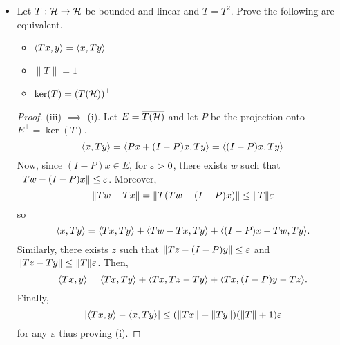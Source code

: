 \begin{itemize}
\item Let $T : \mathcal{H} \to \mathcal{H}$ be bounded and linear and $T=T^2$. Prove the following are equivalent.
	\begin{itemize}
		\item[(i)] $\langle Tx,y\rangle = \langle x,Ty\rangle$
		\item[(ii)] $\|T\|=1$
		\item[(iii)] $\ker(T)=(T(\mathcal{H}))^\perp$
	\end{itemize}
\begin{proof}
(iii) $\implies$ (i). Let $E = \overline{T(\mathcal{H})}$ and let $P$ be the projection onto $E^\perp = \ker(T)$.
	\[ \langle x,Ty \rangle = \langle Px + (I-P)x,Ty \rangle = \langle (I-P)x,Ty \rangle \]
Now, since $(I-P)x \in E$, for $\varepsilon>0$, there exists $w$ such that $\|Tw-(I-P)x\| \le \varepsilon$. Moreover,
	\[ \|Tw - Tx\| = \|T(Tw-(I-P)x)\| \le \|T\| \varepsilon \]
so
	\[ \langle x,Ty \rangle = \langle Tx,Ty \rangle + \langle Tw-Tx,Ty \rangle + \langle (I-P)x-Tw,Ty \rangle. \]
Similarly, there exists $z$ such that $\|Tz-(I-P)y\| \le \varepsilon$ and $\|Tz-Ty\| \le \|T\|\varepsilon$. Then,
	\[ \langle Tx,y \rangle = \langle Tx,Ty \rangle + \langle Tx,Tz-Ty \rangle + \langle Tx,(I-P)y-Tz \rangle. \]
Finally,
	\[ |\langle Tx,y \rangle - \langle x,Ty\rangle| \le (\|Tx\| + \|Ty\|)(\|T\|+1)\varepsilon \]
for any $\varepsilon$ thus proving (i).


\end{proof}
\end{itemize}